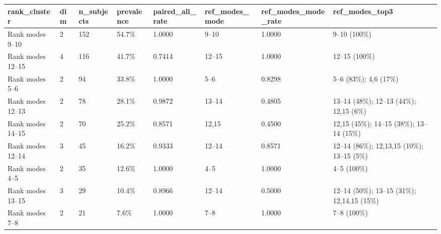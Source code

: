 \begin{tabular}{llllllll}
\toprule
rank\_cluster & dim & n\_subjects & prevalence & paired\_all\_rate & ref\_modes\_mode & ref\_modes\_mode\_rate & ref\_modes\_top3 \\
\midrule
Rank modes 9--10 & 2 & 152 & 54.7\% & 1.0000 & 9--10 & 1.0000 & 9--10 (100\%) \\
Rank modes 12--15 & 4 & 116 & 41.7\% & 0.7414 & 12--15 & 1.0000 & 12--15 (100\%) \\
Rank modes 5--6 & 2 & 94 & 33.8\% & 1.0000 & 5--6 & 0.8298 & 5--6 (83\%); 4,6 (17\%) \\
Rank modes 12--13 & 2 & 78 & 28.1\% & 0.9872 & 13--14 & 0.4805 & 13--14 (48\%); 12--13 (44\%); 12,15 (6\%) \\
Rank modes 14--15 & 2 & 70 & 25.2\% & 0.8571 & 12,15 & 0.4500 & 12,15 (45\%); 14--15 (38\%); 13--14 (15\%) \\
Rank modes 12--14 & 3 & 45 & 16.2\% & 0.9333 & 12--14 & 0.8571 & 12--14 (86\%); 12,13,15 (10\%); 13--15 (5\%) \\
Rank modes 4--5 & 2 & 35 & 12.6\% & 1.0000 & 4--5 & 1.0000 & 4--5 (100\%) \\
Rank modes 13--15 & 3 & 29 & 10.4\% & 0.8966 & 12--14 & 0.5000 & 12--14 (50\%); 13--15 (31\%); 12,14,15 (15\%) \\
Rank modes 7--8 & 2 & 21 & 7.6\% & 1.0000 & 7--8 & 1.0000 & 7--8 (100\%) \\
\bottomrule
\end{tabular}
